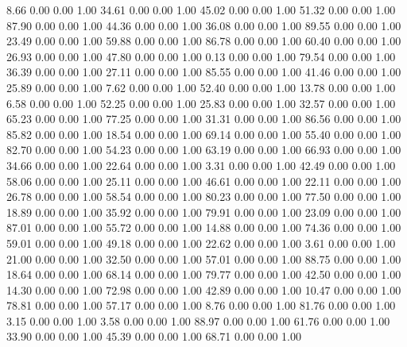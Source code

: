     8.66   0.00   0.00   1.00
   34.61   0.00   0.00   1.00
   45.02   0.00   0.00   1.00
   51.32   0.00   0.00   1.00
   87.90   0.00   0.00   1.00
   44.36   0.00   0.00   1.00
   36.08   0.00   0.00   1.00
   89.55   0.00   0.00   1.00
   23.49   0.00   0.00   1.00
   59.88   0.00   0.00   1.00
   86.78   0.00   0.00   1.00
   60.40   0.00   0.00   1.00
   26.93   0.00   0.00   1.00
   47.80   0.00   0.00   1.00
    0.13   0.00   0.00   1.00
   79.54   0.00   0.00   1.00
   36.39   0.00   0.00   1.00
   27.11   0.00   0.00   1.00
   85.55   0.00   0.00   1.00
   41.46   0.00   0.00   1.00
   25.89   0.00   0.00   1.00
    7.62   0.00   0.00   1.00
   52.40   0.00   0.00   1.00
   13.78   0.00   0.00   1.00
    6.58   0.00   0.00   1.00
   52.25   0.00   0.00   1.00
   25.83   0.00   0.00   1.00
   32.57   0.00   0.00   1.00
   65.23   0.00   0.00   1.00
   77.25   0.00   0.00   1.00
   31.31   0.00   0.00   1.00
   86.56   0.00   0.00   1.00
   85.82   0.00   0.00   1.00
   18.54   0.00   0.00   1.00
   69.14   0.00   0.00   1.00
   55.40   0.00   0.00   1.00
   82.70   0.00   0.00   1.00
   54.23   0.00   0.00   1.00
   63.19   0.00   0.00   1.00
   66.93   0.00   0.00   1.00
   34.66   0.00   0.00   1.00
   22.64   0.00   0.00   1.00
    3.31   0.00   0.00   1.00
   42.49   0.00   0.00   1.00
   58.06   0.00   0.00   1.00
   25.11   0.00   0.00   1.00
   46.61   0.00   0.00   1.00
   22.11   0.00   0.00   1.00
   26.78   0.00   0.00   1.00
   58.54   0.00   0.00   1.00
   80.23   0.00   0.00   1.00
   77.50   0.00   0.00   1.00
   18.89   0.00   0.00   1.00
   35.92   0.00   0.00   1.00
   79.91   0.00   0.00   1.00
   23.09   0.00   0.00   1.00
   87.01   0.00   0.00   1.00
   55.72   0.00   0.00   1.00
   14.88   0.00   0.00   1.00
   74.36   0.00   0.00   1.00
   59.01   0.00   0.00   1.00
   49.18   0.00   0.00   1.00
   22.62   0.00   0.00   1.00
    3.61   0.00   0.00   1.00
   21.00   0.00   0.00   1.00
   32.50   0.00   0.00   1.00
   57.01   0.00   0.00   1.00
   88.75   0.00   0.00   1.00
   18.64   0.00   0.00   1.00
   68.14   0.00   0.00   1.00
   79.77   0.00   0.00   1.00
   42.50   0.00   0.00   1.00
   14.30   0.00   0.00   1.00
   72.98   0.00   0.00   1.00
   42.89   0.00   0.00   1.00
   10.47   0.00   0.00   1.00
   78.81   0.00   0.00   1.00
   57.17   0.00   0.00   1.00
    8.76   0.00   0.00   1.00
   81.76   0.00   0.00   1.00
    3.15   0.00   0.00   1.00
    3.58   0.00   0.00   1.00
   88.97   0.00   0.00   1.00
   61.76   0.00   0.00   1.00
   33.90   0.00   0.00   1.00
   45.39   0.00   0.00   1.00
   68.71   0.00   0.00   1.00

